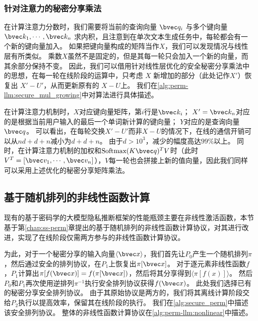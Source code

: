 \subsubsection{针对注意力的秘密分享乘法}
在计算注意力分数时，我们需要将当前的查询向量 $\bvec q_i$ 与多个键向量 $\bvec k_1, \cdots, \bvec k_n$ 求内积，且注意到在单次文本生成任务中，每轮都会有一个新的键向量加入。
%
如果把键向量构成的矩阵当作$X$，我们可以发现情况与线性层有所类似。
乘数$X$虽然不是固定的，但是其每一轮只会加入一个新的向量，而其余部分保持不变。
%
因此，我们可以借用针对线性层优化的安全秘密分享乘法中的思想，在每一轮在线阶段的运算中，只考虑 $X$ 新增加的部分（此处记作$X'$）恢复出 $X' - U'$，从而更新原有的 $X - U$上。
%
我们在\autoref{alg:perm-llm:secure_mul_growing}中对算法进行具体描述。



在计算注意力机制时，$X$对应键向量矩阵，第$i$行是$\bvec k_i$；
$X' = \bvec k_n$对应的是根据当前用户输入的最后一个单词新计算的键向量；
%
$Y$对应的是查询向量 $\bvec q$。
%
可以看出，在每轮交换$X' - U'$而非$X - U$的情况下，在线的通信开销可以从$nd + d + n$减小为$d + d + n$。
%
由于$d > 10^3$，减少的幅度高达$99\%$以上。
%
同时，在计算注意力机制的加权和$\text{Softmax}(K\bvec q)^T V$时（此时$V^T = [\bvec v_1, \cdots, \bvec v_n]$），$V$每一轮也会拼接上新的值向量，因此我们同样可以采用上述优化的秘密分享矩阵乘法。


\subsection{基于随机排列的非线性函数计算}
现有的基于密码学的大模型隐私推断框架的性能瓶颈主要在非线性激活函数，本节基于第\ref{chap:ss-perm}章提出的基于随机排列的非线性函数计算协议，对其进行改进，实现了在线阶段仅需两方参与的非线性函数计算协议。


为此，对于一个秘密分享的输入向量$\langle \bvec x \rangle$，我们首先让$P_0$产生一个随机排列$\pi$，然后通过安全的排列协议，在$P_1$上恢复出$\pi[\bvec x]$。
对于逐元素非线性函数$f$，$P_1$计算出$\pi[f(\bvec x)] = f(\pi[\bvec x])$，然后将其分享得到$\langle \pi[f(x)] \rangle$。
%
然后$P_0$和$P_1$再次使用逆排列$\pi^{-1}$执行安全排列协议获得$f(\bvec x)$。
%
此处我们选择已有的秘密分享安全排列协议\cite{chase_2020_secret_shared_shuffle}。
由于其原始协议是两方的，我们将其离线计算阶段交给$P_2$执行以提高效率，保留其在线阶段的执行。
%
我们在\autoref{alg:secure_perm}中描述该安全排列协议。
整体的非线性函数计算协议在\autoref{alg:perm-llm:nonlinear}中描述。


